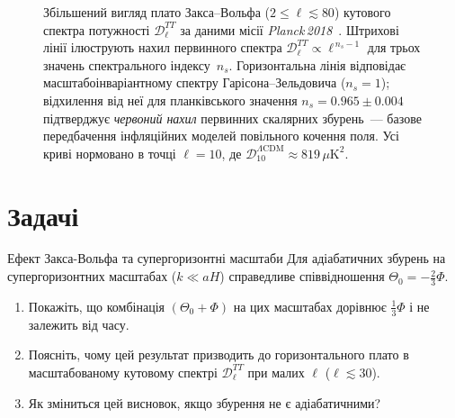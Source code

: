 \begin{figure}[htbp]
\caption{%
    Збільшений вигляд плато Закса--Вольфа ($2 \leq \ell \lesssim 80$)
    кутового спектра потужності $\mathcal{D}_\ell^{TT}$
    за даними місії \emph{Planck\,2018}~\cite{planck_2018}.
    Штрихові лінії ілюструють нахил первинного спектра
    $\mathcal{D}_\ell^{TT} \propto \ell^{\,n_s - 1}$
    для трьох значень спектрального індексу~$n_s$.
    Горизонтальна лінія відповідає масштабоінваріантному спектру
    Гарісона--Зельдовича ($n_s = 1$);
    відхилення від неї для планківського значення
    $n_s = 0.965 \pm 0.004$ підтверджує \emph{червоний нахил}
    первинних скалярних збурень~--- базове передбачення
    інфляційних моделей повільного кочення поля.
    Усі криві нормовано в точці $\ell = 10$,
    де $\mathcal{D}_{10}^{\Lambda\mathrm{CDM}} \approx 819\,\mu\mathrm{K}^2$.%
}
\label{fig:ns_tilt}
\end{figure}

\section*{Задачі}

\begin{problem}{Ефект Закса-Вольфа та супергоризонтні масштаби}
Для адіабатичних збурень на супергоризонтних масштабах
($k \ll aH$) справедливе співвідношення $\Theta_0 = -\frac{2}{3}\Phi$.

\begin{enumerate}
    \item Покажіть, що комбінація $(\Theta_0 + \Phi)$ на цих масштабах
          дорівнює $\frac{1}{3}\Phi$ і не залежить від часу.
    \item Поясніть, чому цей результат призводить до горизонтального
          плато в масштабованому кутовому спектрі $\mathcal{D}_\ell^{TT}$
          при малих $\ell$ ($\ell \lesssim 30$).
    \item Як зміниться цей висновок, якщо збурення не є адіабатичними?
\end{enumerate}
\end{problem}

